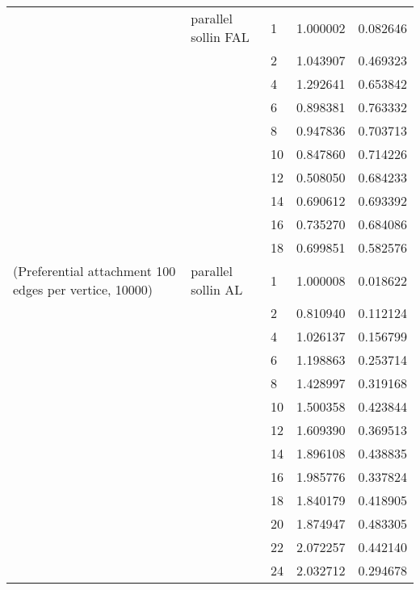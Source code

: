 \begin{tabular}{lllrr}
                      & parallel sollin FAL & 1  &  1.000002 &  0.082646 \\
                      &                     & 2  &  1.043907 &  0.469323 \\
                      &                     & 4  &  1.292641 &  0.653842 \\
                      &                     & 6  &  0.898381 &  0.763332 \\
                      &                     & 8  &  0.947836 &  0.703713 \\
                      &                     & 10 &  0.847860 &  0.714226 \\
                      &                     & 12 &  0.508050 &  0.684233 \\
                      &                     & 14 &  0.690612 &  0.693392 \\
                      &                     & 16 &  0.735270 &  0.684086 \\
                      &                     & 18 &  0.699851 &  0.582576 \\
(Preferential attachment 100 edges per vertice, 10000) & parallel sollin AL & 1  &  1.000008 &  0.018622 \\
                      &                     & 2  &  0.810940 &  0.112124 \\
                      &                     & 4  &  1.026137 &  0.156799 \\
                      &                     & 6  &  1.198863 &  0.253714 \\
                      &                     & 8  &  1.428997 &  0.319168 \\
                      &                     & 10 &  1.500358 &  0.423844 \\
                      &                     & 12 &  1.609390 &  0.369513 \\
                      &                     & 14 &  1.896108 &  0.438835 \\
                      &                     & 16 &  1.985776 &  0.337824 \\
                      &                     & 18 &  1.840179 &  0.418905 \\
                      &                     & 20 &  1.874947 &  0.483305 \\
                      &                     & 22 &  2.072257 &  0.442140 \\
                      &                     & 24 &  2.032712 &  0.294678 \\

\end{tabular}
